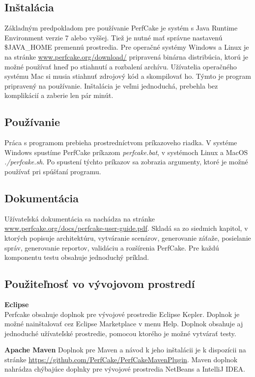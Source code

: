 \documentclass[12pt,oneside,final]{fithesis-utf8}
\begin{document}
\subsection{Inštalácia}
Základným predpokladom pre používanie PerfCake je systém s Java Runtime Environment verzie 7 alebo vyššej. Tiež je nutné mať správne nastavenú \$JAVA\_{}HOME premennú prostredia. Pre operačné systémy Windows a Linux je na stránke \url{www.perfcake.org/download/} pripravená binárna distribúcia, ktorú je možné používať hneď po stiahnutí a rozbalení archívu. Užívatelia operačného systému Mac si musia stiahnuť zdrojový kód a skompilovať ho. Týmto je program pripravený na používanie. Inštalácia je veľmi jednoduchá, prebehla bez komplikácií a zaberie len pár minút.

\subsection{Používanie}
Práca s programom prebieha prostredníctvom príkazoveho riadka. V systéme Windows spustíme PerfCake príkazom \textit{perfcake.bat}, v systémoch Linux a MacOS \textit{./perfcake.sh}. Po spustení týchto príkazov sa zobrazia argumenty, ktoré je možné používať pri spúšťaní programu.

\subsection{Dokumentácia}
Užívateľská dokumentácia sa nachádza na stránke \url{www.perfcake.org/docs/perfcake-user-guide.pdf}. Skladá sa zo siedmich kapitol, v ktorých popisuje architektúru, vytváranie scenárov, generovanie záťaže, posielanie správ, generovanie reportov, validáciu a rozšírenia PerfCake. Pre každú komponentu testu obsahuje jednoduchý príklad.

\subsection{Použiteľnosť vo vývojovom prostredí}
\textbf{Eclipse}\\
Perfcake obsahuje doplnok pre vývojové prostredie Eclipse Kepler. Doplnok je možné nainštalovať cez Eclipse Marketplace v menu Help. Doplnok obsahuje aj jednoduché užívateľské prostredie, pomocou ktorého je možné vytvárať testy.

\textbf{Apache Maven}
Doplnok pre Maven a návod k jeho inštalácii je k dispozícii na stránke \url{https://github.com/PerfCake/PerfCakeMavenPlugin}. Maven doplnok nahrádza chýbajúce doplnky pre vývojové prostredia NetBeans a IntelliJ IDEA.
\end{document}
